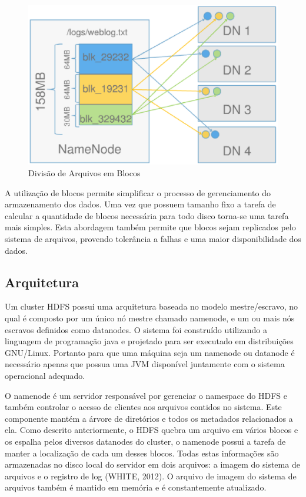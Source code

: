 \begin{figure}[h!]
	\centering
	\includegraphics[keepaspectratio=true,scale=0.45]
	  {figuras/hdfs-blocos.eps}
	\caption{Divisão de Arquivos em Blocos}
	\label{fig-hdfs-blocos}
\end{figure}

A utilização de blocos permite simplificar o processo de gerenciamento do armazenamento dos dados. Uma vez que possuem tamanho fixo a tarefa de calcular a quantidade de blocos necessária para todo disco torna-se uma tarefa mais simples. Esta abordagem também permite que blocos sejam replicados pelo sistema de arquivos, provendo tolerância a falhas e uma maior disponibilidade dos dados.

\subsection{Arquitetura}

Um cluster HDFS possui uma arquitetura baseada no modelo mestre/escravo, no qual é composto por um único nó mestre chamado namenode, e um ou mais nós escravos definidos como datanodes. O sistema foi construído utilizando a linguagem de programação java e projetado para ser executado em distribuições GNU/Linux. Portanto para que uma máquina seja um namenode ou datanode é necessário apenas que possua uma JVM disponível juntamente com o sistema operacional adequado.

O namenode é um servidor responsável por gerenciar o namespace do HDFS e também controlar o acesso de clientes aos arquivos contidos no sistema. Este componente mantém a árvore de diretórios e todos os metadados relacionados a ela. Como descrito anteriormente, o HDFS quebra um arquivo em vários blocos e os espalha pelos diversos datanodes do cluster, o namenode possui a tarefa de manter a localização de cada um desses blocos. Todas estas informações são armazenadas no disco local do servidor em dois arquivos: a imagem do sistema de arquivos e o registro de log (WHITE, 2012). O arquivo de imagem do sistema de arquivos também é mantido em memória e é constantemente atualizado.


